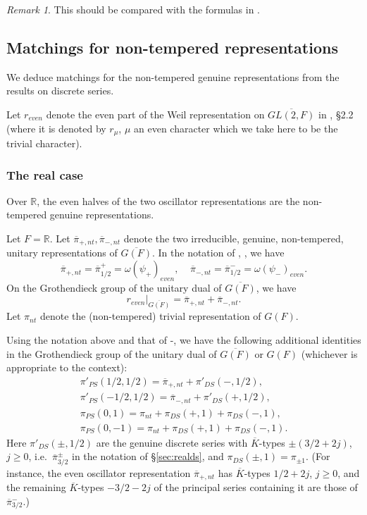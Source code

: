 \documentclass[12pt,letterpaper]{book}
\theoremstyle{plain}
\theoremstyle{definition}
\theoremstyle{remark}
\newtheorem{remark}[theorem]{Remark}
\theoremstyle{remark}
\begin{document}
\begin{remark}
This should be compared with the formulas in \cite{H}.
\end{remark}

\subsection{Matchings for non-tempered representations}

We deduce matchings for the non-tempered genuine representations from the results on discrete series.


Let $r_{even}$ denote the even part of the Weil representation
on $\overline{GL(2,F)}$ in \cite{Fl}, \S 2.2 (where it is denoted by
$r_\mu$, $\mu$ an even character which we take here to be the
trivial character).

\subsubsection{The real case}

Over ${\mathbb R}$, the even halves of the two oscillator representations are the non-tempered genuine representations.


Let $F={\mathbb{R}}$. Let $\overline{\pi}_{+,nt},\overline{\pi}_{-,nt}$
denote the two irreducible, genuine, non-tempered, unitary representations
of $\overline{G(F)}$. In the notation of \cite{Ad1}, \cite{Ge2}, we have
\[
\overline{\pi}_{+,nt}
=\overline{\pi}^+_{1/2}=\omega(\psi_+)_{even},
\ \ \ \ \
\overline{\pi}_{-,nt}
=\overline{\pi}^-_{1/2}=\omega(\psi_-)_{even}.
\]
On the Grothendieck group of the unitary dual of $\overline{G(F)}$,
we have
\[
r_{even}|_{\overline{G(F)}}=
\overline{\pi}_{+,nt}+\overline{\pi}_{-,nt}.
\]
Let $\pi_{nt}$ denote the (non-tempered) trivial representation of $G(F)$.

Using the notation above and that
of \cite{Ad1}-\cite{Ad2}, we have the following additional
identities in the Grothendieck group
of the unitary dual of $\overline{G(F)}$ or $G(F)$
(whichever is appropriate to the context):
\begin{equation}\label{eq:groth}
\begin{array}{c}
\pi'_{PS}(1/2,1/2)=\overline{\pi}_{+,nt}+\pi'_{DS}(-,1/2),\\
\pi'_{PS}(-1/2,1/2)=\overline{\pi}_{-,nt}+\pi'_{DS}(+,1/2),\\
\pi_{PS}(0,1)=\pi_{nt}+\pi_{DS}(+,1)+\pi_{DS}(-,1),\\
\pi_{PS}(0,-1)=\pi_{nt}+\pi_{DS}(+,1)+\pi_{DS}(-,1).
\end{array}
\end{equation}
Here $\pi'_{DS}(\pm,1/2)$ are the genuine discrete series with
$\overline K$-types $\pm(3/2+2j)$, $j\ge0$, i.e.\
$\overline\pi{}^{\pm}_{3/2}$ in the notation of \S\ref{sec:realds}, and
$\pi_{DS}(\pm,1)=\pi_{\pm1}$. (For instance, the even oscillator
representation $\overline\pi_{+,nt}$ has $\overline K$-types
$1/2+2j$, $j\geq0$, and the remaining $\overline K$-types $-3/2-2j$ of the
principal series containing it are those of $\overline\pi{}^-_{3/2}$.)
\end{document}
